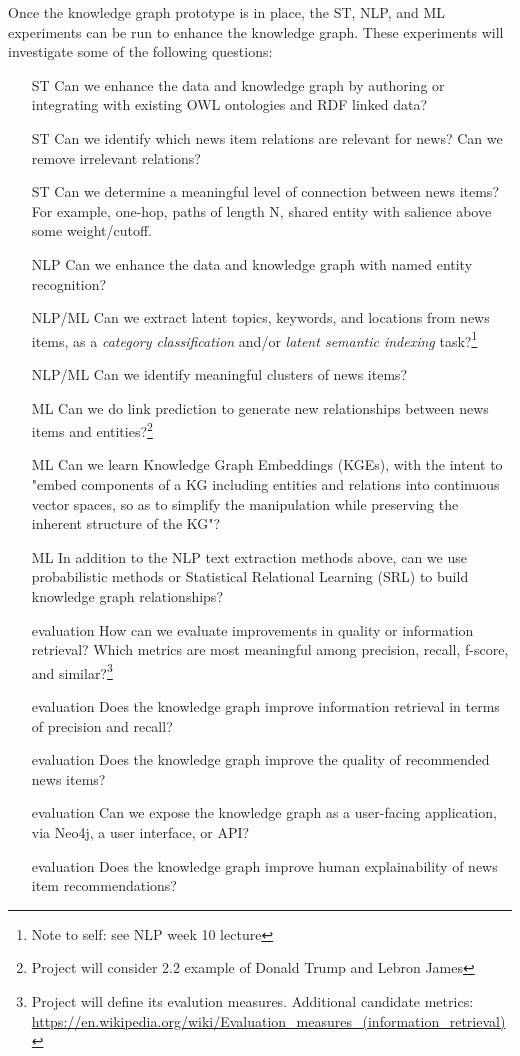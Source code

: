 \documentclass[11pt]{article}
\begin{document}
Once the knowledge graph prototype is in place, the ST, NLP, and ML experiments can be run to enhance the knowledge graph. These experiments will investigate some of the following questions:
\begin{itemize}
\item [ST] Can we enhance the data and knowledge graph by authoring or integrating with existing OWL ontologies and RDF linked data?
\item [ST] Can we identify which news item relations are relevant for news? Can we remove irrelevant relations?
\item [ST] Can we determine a meaningful level of connection between news items? For example, one-hop, paths of length N, shared entity with salience above some weight/cutoff.
\item [NLP] Can we enhance the data and knowledge graph with named entity recognition?
\item [NLP/ML] Can we extract latent topics, keywords, and locations from news items, as a \textit{category classification} and/or \textit{latent semantic indexing} task?\footnote{Note to self: see NLP week 10 lecture}
\item [NLP/ML] Can we identify meaningful clusters of news items?
\item [ML] Can we do link prediction to generate new relationships between news items and entities?\footnote{Project will consider 2.2 example of Donald Trump and Lebron James\cite{liu2019news}}
\item [ML] Can we learn Knowledge Graph Embeddings (KGEs), with the intent to "embed components of a KG including entities and relations into continuous vector spaces, so as to simplify the manipulation while preserving the inherent structure of the KG"?\cite{wang2017knowledge}
\item [ML] In addition to the NLP text extraction methods above, can we use probabilistic methods\cite{45634} or Statistical Relational Learning (SRL)\cite{nickel2015review} to build knowledge graph relationships?
\item [evaluation] How can we evaluate improvements in quality or information retrieval? Which metrics are most meaningful among precision, recall, f-score, and similar?\footnote{Project will define its evalution measures. Additional candidate metrics:\\
\url{https://en.wikipedia.org/wiki/Evaluation_measures_(information_retrieval)}}
\item [evaluation] Does the knowledge graph improve information retrieval in terms of precision and recall?
\item [evaluation] Does the knowledge graph improve the quality of recommended news items?
\item [evaluation] Can we expose the knowledge graph as a user-facing application, via Neo4j, a user interface, or API?
\item [evaluation] Does the knowledge graph improve human explainability of news item recommendations?
\end{itemize}
\end{document}
